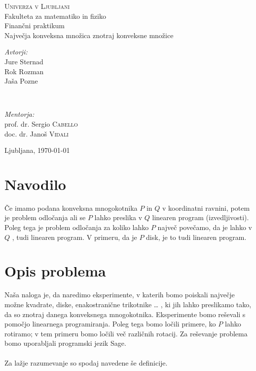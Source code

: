 \documentclass[a4paper, 12pt]{article}
\begin{document}
\begin{titlepage}
    \begin{center}
        \textsc{\LARGE Univerza v Ljubljani}\\[0.5cm]
        {\Large Fakulteta za matematiko in fiziko}\\[3cm]
        {\large Finančni praktikum}\\[0.5cm]
        {\huge Največja konveksna množica znotraj konveksne množice}\\[10.0cm]
    \end{center}

    \begin{minipage}{0.4\textwidth}
		\begin{flushleft}
			\large
			\textit{Avtorji:}\\
			Jure Sternad \\
			Rok Rozman \\
            Jaša Pozne
		\end{flushleft}
	\end{minipage}
	~
	\begin{minipage}{0.4\textwidth}
		\begin{flushright}
			\large
			\textit{Mentorja:}\\
			prof. dr. Sergio \textsc{Cabello} \\
			doc. dr. Janoš \textsc{Vidali}
		\end{flushright}
	\end{minipage}
	
	\vfill\vfill\vfill 
	\begin{center}
	{\large{Ljubljana, \today}} 
    \end{center}
	\vfill 

\end{titlepage}

\tableofcontents

\newpage

\section{Navodilo}

Če imamo podana konveksna mnogokotnika $P$ in $Q$ v koordinatni ravnini,
 potem je problem odločanja ali se $P$ lahko preslika v $Q$ 
 linearen program (izvedljivosti). 
 Poleg tega je problem odločanja za koliko lahko $P$ največ povečamo,
  da je lahko v $Q$ , tudi linearen program.
   V primeru, da je $P$ disk, je to tudi linearen program.


\section{Opis problema}
Naša naloga je, da naredimo eksperimente, v katerih bomo
poiskali največje možne kvadrate, diske, enakostranične trikotnike … ,
 ki jih lahko preslikamo tako, da so znotraj danega konveksnega
  mnogokotnika. Eksperimente bomo reševali s pomočjo linearnega 
  programiranja. Poleg tega bomo ločili primere, ko $P$ lahko rotiramo;
   v tem primeru bomo ločili več različnih rotacij. 
Za reševanje problema bomo uporabljali programski jezik Sage.
\\~\\
Za lažje razumevanje so spodaj navedene še definicije.
\end{document}

